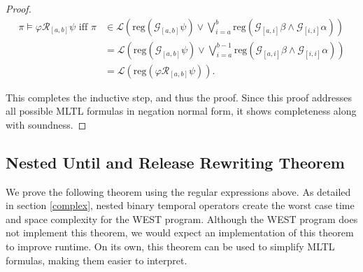 \documentclass[runningheads]{llncs}
\begin{document}
\begin{proof}
  \begin{align*}
    \pi \vDash \varphi \mathcal{R}_{[a,b]} \psi \text{ iff } \pi &\in \mathscr{L}\left(\text{reg}(\mathcal{G}_{[a,b]} \psi) \lor \bigvee_{i=a}^{b} \text{reg}\left(\mathcal{G}_{[a,i]}\beta \land \mathcal{G}_{[i, i]} \alpha\right)\right) \\
    &= \mathscr{L}\left(\text{reg}(\mathcal{G}_{[a,b]} \psi) \lor \bigvee_{i=a}^{b-1} \text{reg}\left(\mathcal{G}_{[a,i]}\beta \land \mathcal{G}_{[i, i]} \alpha\right)\right)\\
    &= \mathscr{L}\left(\text{reg}(\varphi \mathcal{R}_{[a,b]} \psi)\right).
  \end{align*}
  
 \noindent This completes the inductive step, and thus the proof. Since this proof addresses all possible MLTL formulas in negation normal form, it shows completeness along with soundness.
 \end{proof}
 \newpage
\subsection{Nested Until and Release Rewriting Theorem}
 We prove the following theorem using the regular expressions above. As detailed in section \ref{complex}, nested binary temporal operators create the worst case time and space complexity for the WEST program. Although the WEST program does not implement this theorem, we would expect an implementation of this theorem to improve runtime. On its own, this theorem can be used to simplify MLTL formulas, making them easier to interpret.
\end{document}
